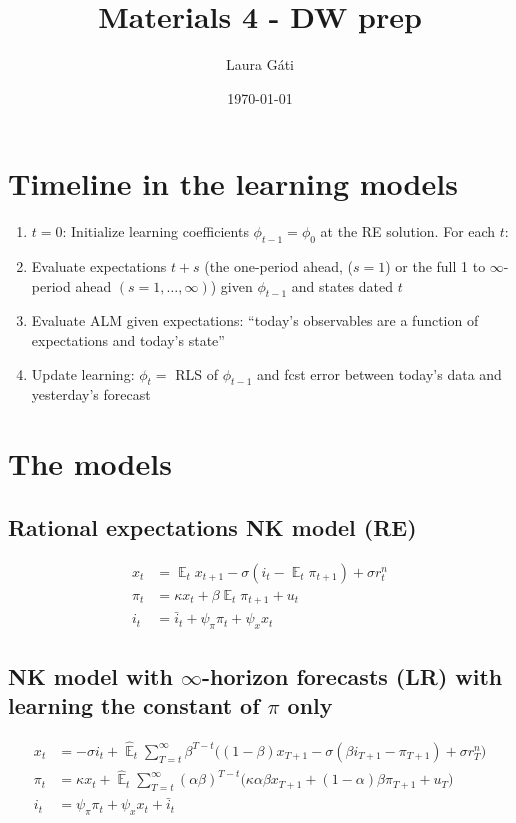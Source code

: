 \documentclass[11pt]{article}
\renewcommand{\[}{\begin{equation}}
\renewcommand{\]}{\end{equation}}
\DeclareMathOperator{\E}{\mathbb{E}}
\begin{document}
\linespread{1.0}

\title{Materials 4 - DW prep}
\author{Laura G\'ati} 
\date{\today}
\maketitle


\tableofcontents


\newpage


\section{Timeline in the learning models}
\begin{enumerate}
\item[] \underline{$t=0$}: Initialize learning coefficients $\phi_{t-1} = \phi_0$ at the RE solution. For each $t$:
\item Evaluate expectations $t+s$ (the one-period ahead, ($s=1$) or the full 1 to $\infty$-period ahead $(s=1,\dots, \infty)$) given $\phi_{t-1}$ and states dated $t$
\item Evaluate ALM given expectations: ``today's observables are a function of expectations and today's state''
\item Update learning: $\phi_{t}= $ RLS of $\phi_{t-1}$ and fcst error between today's data and yesterday's forecast
\end{enumerate}

\section{The models}
\subsection{Rational expectations NK model (RE)}
\begin{align}
x_t &= \E_t x_{t+1} - \sigma(i_t - \E_t \pi_{t+1}) +\sigma r_t^n \label{NKIS} \\
\pi_t &= \kappa x_t +\beta \E_t \pi_{t+1} + u_t  \label{NKPC} \\
i_t &= \bar{i}_t + \psi_{\pi}\pi_t + \psi_{x} x_t  \label{TR}
\end{align}
\subsection{NK model with $\infty$-horizon forecasts (LR) with learning the constant of $\pi$ only}
\begin{align}
x_t &=  -\sigma i_t +\hat{\E}_t \sum_{T=t}^{\infty} \beta^{T-t }\big( (1-\beta)x_{T+1} - \sigma(\beta i_{T+1} - \pi_{T+1}) +\sigma r_T^n \big) \tag{Preston, eq. (18)} \label{prestons18}  \\
\pi_t &= \kappa x_t +\hat{\E}_t \sum_{T=t}^{\infty} (\alpha\beta)^{T-t }\big( \kappa \alpha \beta x_{T+1} + (1-\alpha)\beta \pi_{T+1} + u_T\big)\tag{Preston, eq. (19)} \label{prestons19}  \\
i_t &= \psi_{\pi}\pi_t + \psi_{x} x_t + \bar{i}_t \tag{Preston, eq. (27)} 
\end{align}
\end{document}
